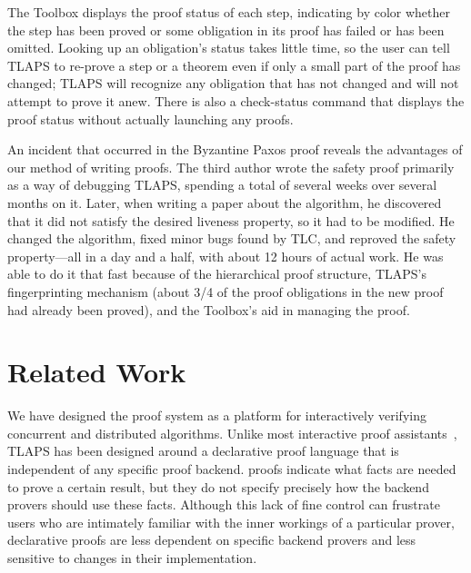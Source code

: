 \documentclass[a4paper,draft]{llncs}
\begin{document}
The Toolbox displays the proof status of each step, indicating by
color whether the step has been proved or some obligation in its proof
has failed or has been omitted.
Looking up an obligation's status takes little time, so the user can tell TLAPS
to re-prove a step or a theorem even if only a small part of the proof has
changed; TLAPS will recognize any obligation that has not changed and
will not attempt to prove it anew.
There is also a check-status command that displays the proof status without
actually launching any proofs. 

An incident that occurred in the Byzantine Paxos proof reveals the
advantages of our method of writing proofs.  The third author wrote
the safety proof primarily as a way of debugging TLAPS, spending a
total of several weeks over several months on it.  Later, when writing a
paper about the algorithm, he discovered that it did not satisfy the
desired liveness property, so it had to be modified.  He changed the
algorithm, fixed minor bugs found by TLC, and reproved the safety
property---all in a day and a half, with about 12 hours of
actual work.  He was able to do it that fast because of the
hierarchical proof structure, TLAPS's fingerprinting mechanism (about
3/4 of the proof obligations in the new proof had already been
proved), and the Toolbox's aid in managing the proof. 


\section{Related Work}
\label{sec:related}

We have designed the \tlaplus proof system as a platform for interactively
verifying concurrent and distributed algorithms. Unlike
most interactive proof assistants~\cite{wiedijk:provers}, TLAPS has been
designed around a declarative proof language that is independent of any specific proof
backend. \tlaplus proofs indicate what facts are needed to prove a certain
result, but they do not specify precisely how the backend provers should use
these facts. %
Although this lack of fine control can frustrate users who are intimately
familiar with the inner workings of a particular prover,
declarative proofs are less dependent on specific backend provers and
less sensitive to changes in their implementation.
\end{document}
